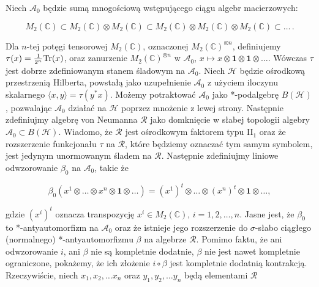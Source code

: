 Niech $\mathcal{A}_{0}$ będzie sumą mnogościową wstępującego ciągu algebr macierzowych:
\begin{linenomath*}
 \begin{equation}
M_{2}(\mathbb{C}) \subset
M_{2}(\mathbb{C}) \otimes M_{2}(\mathbb{C}) \subset
M_{2}(\mathbb{C}) \otimes M_{2}(\mathbb{C}) \otimes M_{2}(\mathbb{C}) \subset
\ldots\, .
 \end{equation}
\end{linenomath*}
Dla $n$-tej potęgi tensorowej $M_{2}(\mathbb{C})$,
oznaczonej $M_{2}(\mathbb{C})^{\otimes n}$,
definiujemy $\tau(x) = \frac{1}{2^{n}} {\rm Tr}(x)$,
oraz zanurzenie
$M_{2}(\mathbb{C})^{\otimes n}$ w $\mathcal{A}_{0}$,
$x \mapsto x \otimes \mathbf{1} \otimes \mathbf{1} \otimes \ldots$.
Wówczas $\tau$ jest dobrze zdefiniowanym stanem śladowym na $\mathcal{A}_{0}$.
Niech $\mathcal{H}$ będzie ośrodkową przestrzenią Hilberta, powstałą jako uzupełnienie
$\mathcal{A}_{0}$ z użyciem iloczynu skalarnego
$\langle x , y \rangle = \tau(y^{*} x )$.
Możemy potraktować $\mathcal{A}_{0}$ jako
\mbox{*-podalgebrę} $B(\mathcal{H})$,
pozwalając $\mathcal{A}_{0}$ działać na $\mathcal{H}$ poprzez mnożenie z lewej strony.
Następnie zdefiniujmy algebrę von Neumanna
$\mathcal{R}$ jako domknięcie w słabej topologii algebry
$\mathcal{A}_{0} \subset B(\mathcal{H})$.
Wiadomo, że
$\mathcal{R}$ jest ośrodkowym faktorem typu II$\phantom{}_{1}$
oraz że rozszerzenie funkcjonału $\tau$ na $\mathcal{R}$,
które będziemy oznaczać tym samym symbolem,
jest jedynym unormowanym śladem na $\mathcal{R}$.
Następnie zdefiniujmy liniowe odwzorowanie
$\beta_{0}$ na $\mathcal{A}_{0}$, takie że
\begin{linenomath*}
 \begin{equation}
\beta_{0}(x^{1} \otimes \ldots\otimes x^{n} \otimes \mathbf{1} \otimes \ldots ) =
(x^{1})^{t} \otimes \ldots\otimes (x^{n})^{t} \otimes \mathbf{1} \otimes \ldots,
 \end{equation}
\end{linenomath*}
gdzie $(x^{i})^{t}$ oznacza transpozycję $x^{i} \in M_{2}(\mathbb{C})$,
$i = 1,2,\ldots,n$.
Jasne jest, że $\beta_{0}$ to *-antyautomorfizm na $\mathcal{A}_{0}$
oraz że istnieje jego rozszerzenie do $\sigma$-słabo ciągłego (normalnego)
*-antyautomorfizmu $\beta$ na algebrze $\mathcal{R}$.
Pomimo faktu, że ani odwzorowanie $i$, ani $\beta$ nie są kompletnie dodatnie,
$\beta$ nie jest nawet kompletnie ograniczone,
pokażemy, że ich złożenie $i \circ \beta$ jest kompletnie dodatnią kontrakcją.
Rzeczywiście, niech $x_{1}, x_{2}, \ldots x_{n}$ oraz
$y_{1}, y_{2}, \ldots y_{n}$ będą elementami $\mathcal{R}$
